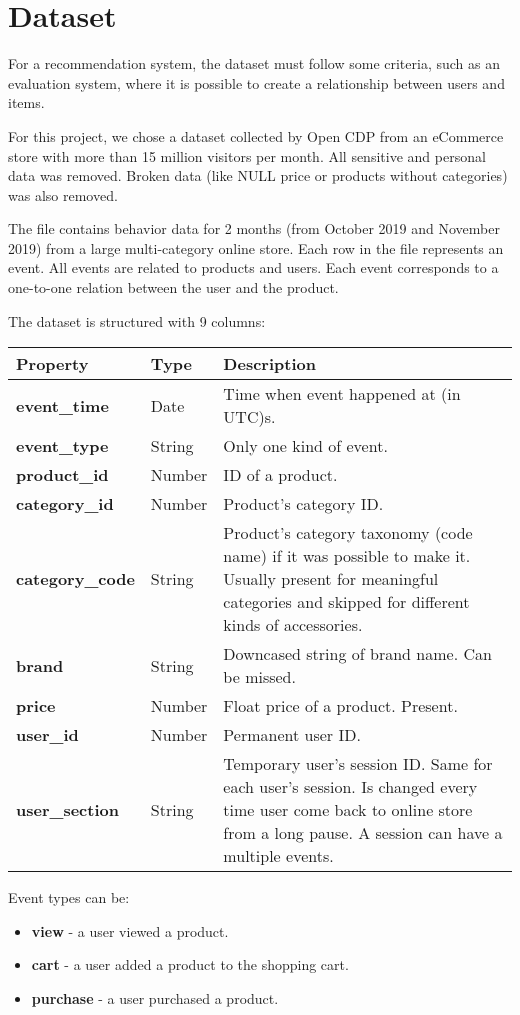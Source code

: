 \section{Dataset}
\label{dataset}

For a recommendation system, the dataset must follow some criteria, such as an evaluation system, where it is possible to create a relationship between users and items.


For this project, we chose a dataset collected by Open CDP from an eCommerce store with more than 15 million visitors per month.
All sensitive and personal data was removed. 
Broken data (like NULL price or products without categories) was also removed.

The file contains behavior data for 2 months (from October 2019 and November 2019) from a large multi-category online store.
Each row in the file represents an event. 
All events are related to products and users.
Each event corresponds to a one-to-one relation between the user and the product.

The dataset is structured with 9 columns:
\begin{center}
\begin{tabular}{ | p{3cm} | p{2cm} | p{5cm} | } 
 \hline
 \textbf{Property} & \textbf{Type} & \textbf{Description} \\ 
 \hline
 \textbf{event\_time} & Date & Time when event happened at (in UTC)s. \\
 \hline
 \textbf{event\_type} & String & Only one kind of event. \\
 \hline
 \textbf{product\_id} & Number & ID of a product. \\
 \hline
 \textbf{category\_id} & Number & Product's category ID. \\
 \hline
 \textbf{category\_code} & String & Product's category taxonomy (code name) if it was possible to make it. Usually present for meaningful categories and skipped for different kinds of accessories. \\
 \hline
 \textbf{brand} & String & Downcased string of brand name. Can be missed. \\
 \hline
 \textbf{price} & Number & Float price of a product. Present. \\
 \hline
 \textbf{user\_id} & Number & Permanent user ID. \\
 \hline
 \textbf{user\_section} & String & Temporary user's session ID. Same for each user's session. Is changed every time user come back to online store from a long pause. A session can have a multiple events. \\
 \hline
\end{tabular}
\end{center}

Event types can be:
\begin{itemize}
    \item \textbf{view} - a user viewed a product.
    \item \textbf{cart} - a user added a product to the shopping cart.
    \item \textbf{purchase} - a user purchased a product.
\end{itemize}
